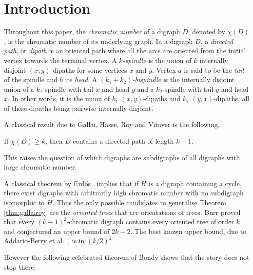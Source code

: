 \documentclass{endm}
\begin{document}
\section{Introduction}
Throughout this paper, the {\it chromatic number} of a digraph $D$, denoted by $\chi(D)$, is the chromatic number of its underlying graph. 
In a digraph $D$, a \emph{directed path}, or \emph{dipath} is an oriented path where all the arcs are oriented from the initial vertex towards the terminal vertex.
A {\it $k$-spindle} is the union of $k$ internally disjoint $(x,y)$-dipaths for some vertices $x$ and $y$. Vertex $a$ is said to be the {\it tail} of the spindle and $b$ its {\it head}.
A {\it $(k_1+k_2)$-bispindle} is the internally disjoint union of a $k_1$-spindle
with tail $x$ and head $y$ and a  $k_2$-spindle with tail $y$ and head $x$.
In other words, it is the union of $k_1$  $(x,y)$-dipaths and $k_2$ $(y,x)$-dipaths, all of these dipaths being pairwise internally disjoint.

A classical result due to Gallai, Hasse, Roy and Vitaver is the following. 
\begin{theorem}\label{thm:gallairoy}
	If $\chi(D) \geq k$, then $D$ contains a directed path of length $k-1$.  
\end{theorem}   

This raises the question of which digraphs are subdigraphs of all digraphs with large chromatic number.



A classical theorem by Erd\H{o}s~\cite{Erd59} implies that if $H$ is a digraph containing a cycle, there exist digraphs with arbitrarily high 
chromatic number with no subdigraph isomorphic to $H$. Thus the only possible candidates to generalise Theorem \ref{thm:gallairoy} are the {\it oriented trees} that are orientations of trees.
Burr\cite{Burr80} proved that every $(k-1)^2$-chromatic digraph contains every oriented tree of order $k$ 
and conjectured an upper bound of $2k-2$.
The best known upper bound, due to Addario-Berry et al.~\cite{AHS+13}, is in $(k/2)^2$.

However the following celebrated theorem of Bondy shows that  the story does not stop there.
\end{document}
